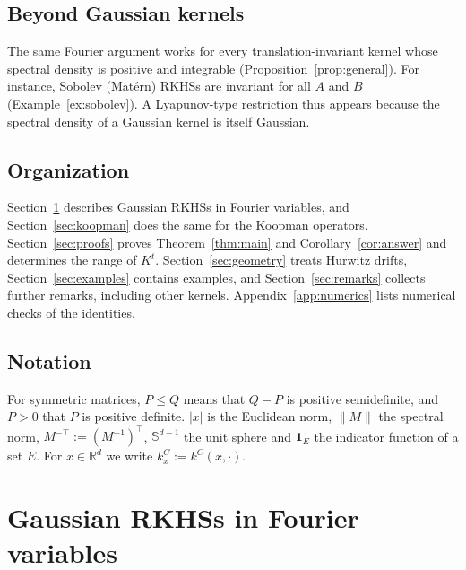 \documentclass[11pt]{amsart}
\numberwithin{equation}{section}
\theoremstyle{definition}
\theoremstyle{remark}
\newcommand{\R}{\mathbb{R}}
\newcommand{\Sph}{\mathbb{S}}
\newcommand{\tp}{\top}
\begin{document}
\subsection*{Beyond Gaussian kernels}
The same Fourier argument works for every translation-invariant kernel whose spectral density is positive and
integrable (Proposition~\ref{prop:general}). For instance, Sobolev (Mat\'ern) RKHSs are invariant for all $A$ and $B$
(Example~\ref{ex:sobolev}). A Lyapunov-type restriction thus appears because the spectral density of a Gaussian kernel is
itself Gaussian.

\subsection*{Organization}
Section~\ref{sec:fourier} describes Gaussian RKHSs in Fourier variables, and Section~\ref{sec:koopman} does the
same for the Koopman operators. Section~\ref{sec:proofs} proves Theorem~\ref{thm:main} and
Corollary~\ref{cor:answer} and determines the range of $K^t$. Section~\ref{sec:geometry} treats Hurwitz drifts,
Section~\ref{sec:examples} contains examples, and Section~\ref{sec:remarks} collects further remarks, including
other kernels. Appendix~\ref{app:numerics} lists numerical checks of the identities.

\subsection*{Notation}
For symmetric matrices, $P\le Q$ means that $Q-P$ is positive semidefinite, and $P>0$ that $P$ is positive definite.
$|x|$ is the Euclidean norm, $\|M\|$ the spectral norm, $M^{-\tp}:=(M^{-1})^\tp$, $\Sph^{d-1}$ the unit sphere and
$\mathbf 1_E$ the indicator function of a set $E$. For $x\in\R^d$ we write $k^C_x:=k^C(x,\cdot)$.

\section{Gaussian RKHSs in Fourier variables}\label{sec:fourier}
\end{document}
